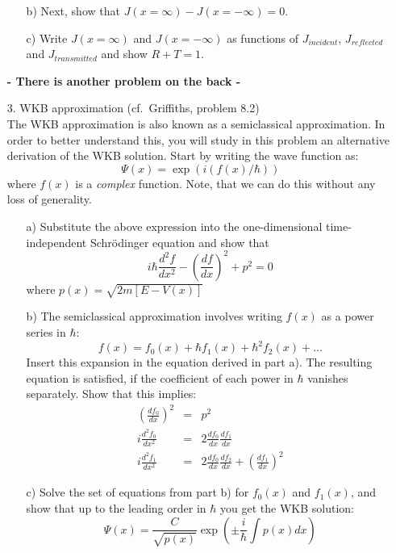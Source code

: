 \documentclass[11pt]{article}
\begin{document}
\begin{itemize}
\begin{itemize}
\item[b)] Next, show that $J(x = \infty) - J(x = -\infty) = 0$.
\item[c)] Write $J(x = \infty)$ and $J(x = -\infty)$ as functions of $J_{incident}$, $J_{reflected}$ and $J_{transmitted}$ and show $R+T=1$.
\end{itemize}
%
\centerline{\bf - There is another problem on the back - }
%
\newpage
%
\item[3.] WKB approximation (cf.\ Griffiths, problem 8.2)\\
The WKB approximation is also known as a semiclassical approximation. In order to better understand this, you will study in this problem an alternative derivation of the WKB solution. Start by writing the wave function as:
\begin{displaymath}
\Psi(x) = \exp(i(f(x)/\hbar))
\end{displaymath}
where $f(x)$ is a {\it complex} function. Note, that we can do this without any loss of generality.
\begin{itemize}
\item[a)]
Substitute the above expression into the one-dimensional time-independent Schr\"odinger equation and show that
\begin{displaymath}
i\hbar \frac{d^2 f}{dx^2} - \left(\frac{d f}{d x}\right)^2 + p^2 = 0
\end{displaymath}
where $p(x) = \sqrt{2m[E-V(x)]}$
\item[b)]
The semiclassical approximation involves writing $f(x)$ as a power series in $\hbar$:
\begin{displaymath}
f(x) = f_0(x) + \hbar f_1(x) + \hbar^2 f_2(x) + \ldots
\end{displaymath}
Insert this expansion in the equation derived in part a). The resulting equation is satisfied, if the coefficient of each power in $\hbar$ vanishes separately. Show that this implies:
\begin{eqnarray*}
\left(\frac{d f_0}{d x}\right)^2 &=& p^2
\\
i\frac{d^2 f_0}{dx^2} &=& 2 \frac{d f_0}{d x}\frac{d f_1}{d x}
\\
i\frac{d^2 f_1}{dx^2} &=& 2 \frac{d f_0}{d x}\frac{d f_2}{d x} + \left(\frac{d f_1}{d x}\right)^2
\end{eqnarray*}
\item[c)]
Solve the set of equations from part b) for $f_0(x)$ and $f_1(x)$, and show that up to the leading order in $\hbar$ you get the WKB solution:
\begin{displaymath}
\Psi(x) = \frac{C}{\sqrt{p(x)}} \exp\left({\pm \frac{i}{\hbar}\int p(x)dx}\right)
\end{displaymath}
\end{itemize}
%
\end{itemize}
\end{document}
